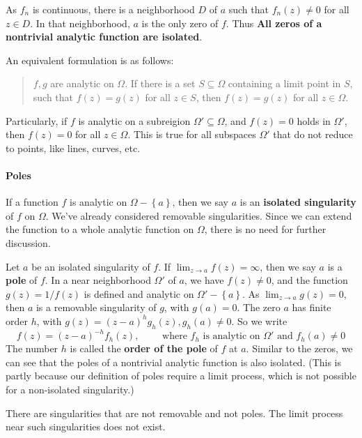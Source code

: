 \documentclass[../main.tex]{subfiles}
\begin{document}
As $f_n$ is continuous, there is a neighborhood $D$ of $a$ such that $f_n(z) \neq 0$ for all $z\in D$. In that neighborhood, $a$ is the only zero of $f$. Thus \textbf{All zeros of a nontrivial analytic function are isolated}.

An equivalent formulation is as follows:
\begin{quote}
	$f,g$ are analytic on $\Omega$. If there is a set $S \subseteq \Omega$ containing a limit point in $S$, such that $f(z) = g(z)$ for all $z\in S$, then $f(z) = g(z)$ for all $z\in \Omega$.
\end{quote}
Particularly, if $f$ is analytic on a subreigion $\Omega' \subseteq \Omega$, and $f(z) = 0$ holds in $\Omega'$, then $f(z) = 0$ for all $z\in \Omega$. This is true for all subspaces $\Omega'$ that do not reduce to points, like lines, curves, etc.

\paragraph{Poles}

If a function $f$ is analytic on $\Omega-\left\{ a \right\}$, then we say $a$ is an \textbf{isolated singularity} of $f$ on $\Omega$. We've already considered removable singularities. Since we can extend the function to a whole analytic function on $\Omega$, there is no need for further discussion.

Let $a$ be an isolated singularity of $f$. If $\displaystyle \lim_{z \to a} f(z) = \infty $, then we say $a$ is a \textbf{pole} of $f$. In a near neighborhood $\Omega'$ of $a$, we have $f(z)\neq 0$, and the function $g(z) = 1 / f(z)$ is defined and analytic on $\Omega'-\left\{ a \right\}$. As $\lim_{z \to a} g(z) = 0$, then $a$ is a removable singularity of $g$, with $g(a) = 0$. The zero $a$ has finite order $h$, with $g(z) = (z-a)^hg_h(z),g_h(a)\neq 0$. So we write
\begin{equation}
	f(z) = (z-a)^{-h} f_h(z), \qquad \text{ where } f_h \text{ is analytic on } \Omega' \text{ and } f_h(a) \neq 0
\end{equation}
The number $h$ is called the \textbf{order of the pole} of $f$ at $a$. Similar to the zeros, we can see that the poles of a nontrivial analytic function is also isolated. (This is partly because our definition of poles require a limit process, which is not possible for a non-isolated singularity.)

\begin{remark}
	There are singularities that are not removable and not poles. The limit process near such singularities does not exist.
\end{remark}
\end{document}
